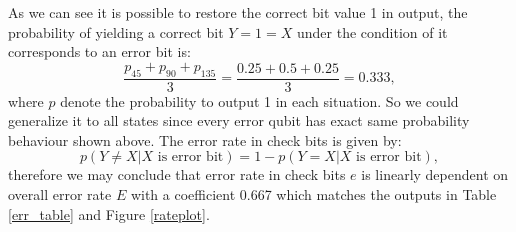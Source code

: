 \documentclass[12pt]{article}
\begin{document}
As we can see it is possible to restore the correct bit value 1 in output, the probability of yielding a correct bit $Y=1=X$ under the condition of it corresponds to an error bit is:
\begin{equation}
\frac{p_{45}+p_{90}+p_{135}}{3} = \frac{0.25+0.5+0.25}{3} = 0.333, \label{q1}
\end{equation}
where $p$ denote the probability to output 1 in each situation. So we could generalize it to all states since every error qubit has exact same probability behaviour shown above. The error rate in check bits is given by:
\[
	p(Y\neq X|X\text{ is error bit})=1-p(Y= X|X\text{ is error bit}),
\]
therefore we may conclude that error rate in check bits $e$ is linearly dependent on overall error rate $E$ with a coefficient 0.667 which matches the outputs in Table \ref{err_table} and Figure \ref{rateplot}.
\end{document}

